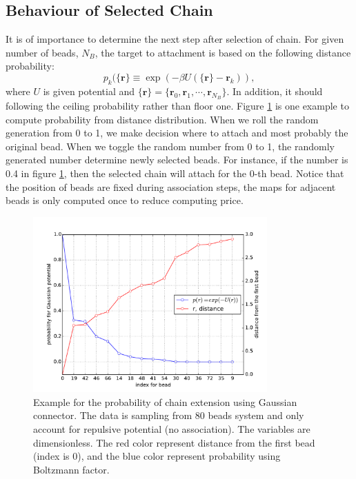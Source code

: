 \message{ !name(brief_Brownian_dynamics.tex)}\documentclass[10pt, a4paper]{report}
\begin{document}
\subsection{Behaviour of Selected Chain}
It is of importance to determine the next step after selection of chain. For given number of beads, $N_B$, the target to attachment is based on the following distance probability:
\begin{equation}
  p_k(\{\mathbf{r}\}\equiv \exp\left(-\beta U(\{\mathbf{r}\} - \mathbf{r}_k)\right),
\end{equation}
where $U$ is given potential and $\{\mathbf{r}\} = \{\mathbf{r}_0, \mathbf{r}_1, \cdots, \mathbf{r}_{N_B}\}$.
In addition, it should following the ceiling probability rather than floor one. 
Figure \ref{fig:probability_80} is one example to compute probability from distance distribution. When we roll the random generation from 0 to 1, we make decision where to attach and most probably the original bead.
When we toggle the random number from 0 to 1, the randomly generated number determine newly selected beads. For instance, if the number is 0.4 in figure \ref{fig:probability_80}, then the selected chain will attach for the 0-th bead. Notice that the position of beads are fixed during association steps, the maps for adjacent beads is only computed once to reduce computing price. 
\begin{figure}
  \centering
  \includegraphics[width=0.8\textwidth]{figures/80_potential_dist.pdf}
  \caption{Example for the probability of chain extension using Gaussian connector. The data is sampling from 80 beads system and only account for repulsive potential (no association). The variables are dimensionless. The red color represent distance from the first bead (index is 0), and the blue color represent probability using Boltzmann factor. }\label{fig:probability_80}
\end{figure}
\end{document}

